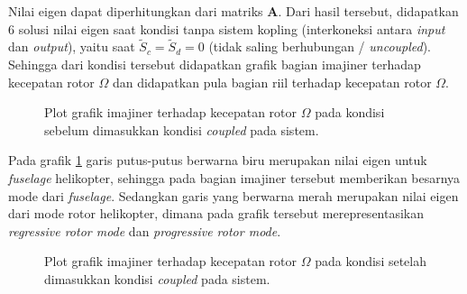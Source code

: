Nilai eigen dapat diperhitungkan dari matriks $\mathbf{A}$. Dari hasil tersebut, didapatkan 6 solusi nilai eigen saat kondisi tanpa sistem kopling (interkoneksi antara \textit{input} dan \textit{output}), yaitu saat $\tilde{S}_c = \tilde{S}_d = 0$ (tidak saling berhubungan / \textit{uncoupled}). Sehingga dari kondisi tersebut didapatkan grafik bagian imajiner terhadap kecepatan rotor $\Omega$ dan didapatkan pula bagian riil terhadap kecepatan rotor $\Omega$.

\begin{figure}[H]
	\centering
	\caption{Plot grafik imajiner terhadap kecepatan rotor $\Omega$ pada kondisi sebelum dimasukkan kondisi \textit{coupled} pada sistem.}
	\label{fig:imag(uncoupled)}
\end{figure}

Pada grafik \ref{fig:imag(uncoupled)} garis putus-putus berwarna biru merupakan nilai eigen untuk \textit{fuselage} helikopter, sehingga pada bagian imajiner tersebut memberikan besarnya mode dari \textit{fuselage}. Sedangkan garis yang berwarna merah merupakan nilai eigen dari mode rotor helikopter, dimana pada grafik tersebut merepresentasikan \textit{regressive rotor mode} dan \textit{progressive rotor mode}. 

\begin{figure}[H]
	\centering
	\caption{Plot grafik imajiner terhadap kecepatan rotor $\Omega$ pada kondisi setelah dimasukkan kondisi \textit{coupled} pada sistem.}
	\label{fig:imag(coupled)}
\end{figure}

